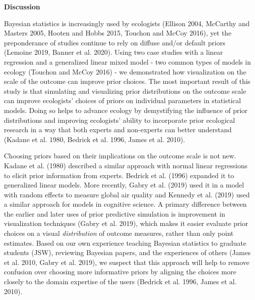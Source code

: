 \documentclass[
  12pt,
]{article}
\begin{document}
\textbf{Discussion}

Bayesian statistics is increasingly used by ecologists (Ellison 2004,
McCarthy and Masters 2005, Hooten and Hobbs 2015, Touchon and McCoy
2016), yet the preponderance of studies continue to rely on diffuse
and/or default priors (Lemoine 2019, Banner et al. 2020). Using two case
studies with a linear regression and a generalized linear mixed model -
two common types of models in ecology (Touchon and McCoy 2016) - we
demonstrated how visualization on the scale of the outcome can improve
prior choices. The most important result of this study is that
simulating and visualizing prior distributions on the outcome scale can
improve ecologists' choices of priors on individual parameters in
statistical models. Doing so helps to advance ecology by demystifying
the influence of prior distributions and improving ecologists' ability
to incorporate prior ecological research in a way that both experts and
non-experts can better understand (Kadane et al. 1980, Bedrick et al.
1996, James et al. 2010).

Choosing priors based on their implications on the outcome scale is not
new. Kadane et al. (1980) described a similar approach with normal
linear regressions to elicit prior information from experts. Bedrick et
al. (1996) expanded it to generalized linear models. More recently,
Gabry et al. (2019) used it in a model with random effects to measure
global air quality and Kennedy et al. (2019) used a similar approach for
models in cognitive science. A primary difference between the earlier
and later uses of prior predictive simulation is improvement in
visualization techniques (Gabry et al. 2019), which makes it easier
evaluate prior choices on a visual \emph{distribution} of outcome
measures, rather than only point estimates. Based on our own experience
teaching Bayesian statistics to graduate students (JSW), reviewing
Bayesian papers, and the experiences of others (James et al. 2010, Gabry
et al. 2019), we suspect that this approach will help to remove
confusion over choosing more informative priors by aligning the choices
more closely to the domain expertise of the users (Bedrick et al. 1996,
James et al. 2010).
\end{document}
